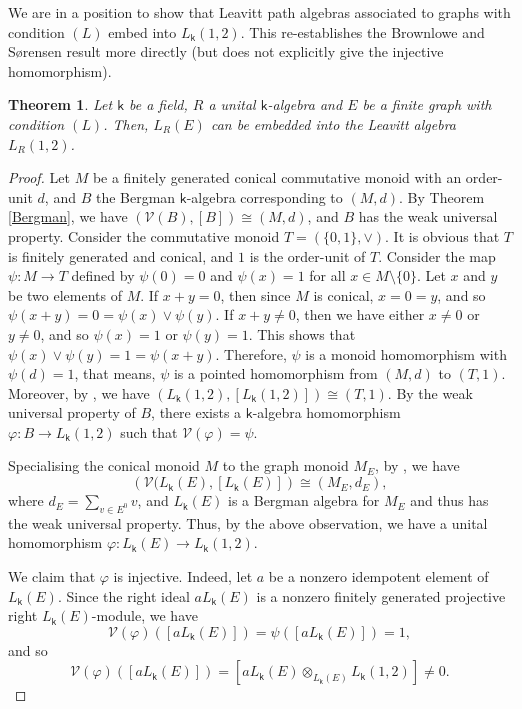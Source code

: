 \documentclass[a4paper, 11pt, reqno]{amsart}
\newtheorem{thm}{Theorem}[section]
\theoremstyle{definition}
\let\phi\varphi
\newcommand{\K}{\mathsf{k}}
\begin{document}
We are in a position to show that Leavitt path algebras associated to graphs with condition $(L)$
embed into $L_\K(1,2)$. This re-establishes the Brownlowe and S\o rensen result more directly (but does not explicitly give the injective homomorphism).

\begin{thm}\label{sLPA-embed}
Let $\K$ be a field, $R$ a unital $\K$-algebra and $E$ be a finite graph with condition $(L)$. Then, $L_R(E)$ can be embedded into the Leavitt algebra $L_R(1, 2)$. 
\end{thm}
\begin{proof}
Let $M$	be a finitely generated conical commutative monoid with an order-unit $d$, and $B$ the Bergman $\K$-algebra corresponding to $(M, d)$.
By Theorem \ref{Bergman}, we have $(\mathcal{V}(B), [B])\cong (M, d)$, and  $B$ has  the weak universal property. 
Consider the commutative monoid $T = (\{0, 1\}, \vee)$. It is obvious that $T$ is finitely generated and conical, and $1$ is the order-unit of $T$. Consider the map $\psi: M\longrightarrow T$ defined by $\psi(0) =0$ and $\psi(x) =1$ for all $x\in M\setminus \{0\}$. Let $x$ and $y$ be two elements of $M$. If $x + y = 0$, then since $M$ is conical, $x =0 =y$, and so $\psi(x + y) = 0 = \psi(x) \vee \psi(y)$. If $x + y \neq 0$, then we have either $x\neq 0$ or $y\neq 0$, and so $\psi(x)= 1$ or $\psi(y)=1$. This shows that $\psi(x) \vee \psi(y) = 1 = \psi(x + y)$. Therefore, $\psi$ is a monoid homomorphism with $\psi(d) =1$, that means, $\psi$ is a pointed homomorphism from $(M, d)$ to $(T, 1)$. Moreover, by \cite[Theorem 3.2.5]{lpabook}, we have $(L_\K(1, 2), [L_\K(1, 2)]) \cong (T, 1)$. By the weak universal property of $B$, there exists a $\K$-algebra homomorphism $\phi: B\longrightarrow L_\K(1, 2)$ such that $\mathcal{V}(\phi) = \psi$.

Specialising  the conical monoid $M$ to the graph monoid $M_E$, by \cite[Theorem~3.5]{ara2006}, we have  $$\left (\mathcal{V}(L_\K(E), [L_\K(E)]\right )\cong (M_{E}, d_{E}),$$ where $ d_{E} = \sum_{v\in E^0}v$, and $L_\K(E)$ is a Bergman algebra for $M_E$ and thus has 
the weak universal property. Thus, by the above observation, we have a unital homomorphism $\phi: L_\K(E) \longrightarrow L_\K(1, 2)$.

We claim that $\phi$ is injective. Indeed, let $a$ be a nonzero idempotent element of $L_\K(E)$. Since the right ideal $aL_\K(E)$ is a nonzero finitely generated projective right $L_\K(E)$-module, we have $$\mathcal{V}(\phi)([aL_\K(E)]) = \psi([aL_\K(E)])= 1,$$ and so 
\[\mathcal{V}(\phi)([aL_\K(E)]) = [aL_\K(E)\otimes_{L_\K(E)} L_\K(1, 2)]\neq 0.\] 


\end{proof}
\end{document}
